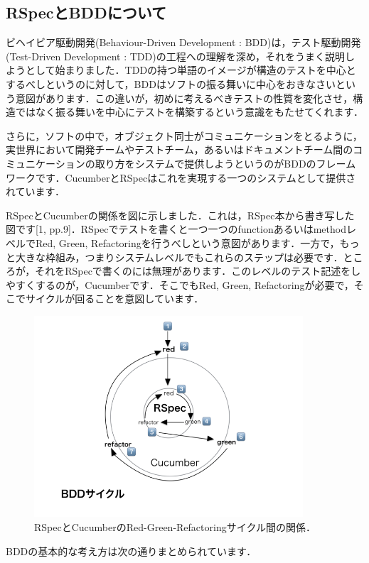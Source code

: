 
\subsection{RSpecとBDDについて}
ビヘイビア駆動開発(Behaviour-Driven Development : BDD)は，テスト駆動開発(Test-Driven Development : TDD)の工程への理解を深め，それをうまく説明しようとして始まりました．TDDの持つ単語のイメージが構造のテストを中心とするべしというのに対して，BDDはソフトの振る舞いに中心をおきなさいという意図があります．この違いが，初めに考えるべきテストの性質を変化させ，構造ではなく振る舞いを中心にテストを構築するという意識をもたせてくれます．

さらに，ソフトの中で，オブジェクト同士がコミュニケーションをとるように，実世界において開発チームやテストチーム，あるいはドキュメントチーム間のコミュニケーションの取り方をシステムで提供しようというのがBDDのフレームワークです．CucumberとRSpecはこれを実現する一つのシステムとして提供されています．

RSpecとCucumberの関係を図に示しました．これは，RSpec本から書き写した図です[1, pp.9]．RSpecでテストを書くと一つ一つのfunctionあるいはmethodレベルでRed, Green, Refactoringを行うべしという意図があります．一方で，もっと大きな枠組み，つまりシステムレベルでもこれらのステップは必要です．ところが，それをRSpecで書くのには無理があります．このレベルのテスト記述をしやすくするのが，Cucumberです．そこでもRed, Green, Refactoringが必要で，そこでサイクルが回ることを意図しています．

\begin{figure}[htbp]\begin{center}
\includegraphics[width=10cm,bb= 0 0 737 553]{../figs/./my_help_nasu.png}
\caption{RSpecとCucumberのRed-Green-Refactoringサイクル間の関係．}
\label{default}\end{center}\end{figure}
BDDの基本的な考え方は次の通りまとめられています．

